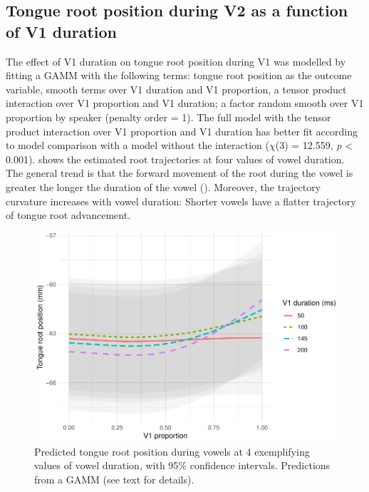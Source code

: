 \documentclass[12pt,]{article}
\begin{document}
\hypertarget{tongue-root-position-during-v2-as-a-function-of-v1-duration}{%
\subsection{Tongue root position during V2 as a function of V1
duration}\label{tongue-root-position-during-v2-as-a-function-of-v1-duration}}

The effect of V1 duration on tongue root position during V1 was modelled
by fitting a GAMM with the following terms: tongue root position as the
outcome variable, smooth terms over V1 duration and V1 proportion, a
tensor product interaction over V1 proportion and V1 duration; a factor
random smooth over V1 proportion by speaker (penalty order = 1). The
full model with the tensor product interaction over V1 proportion and V1
duration has better fit according to model comparison with a model
without the interaction (\(\chi\)(3) = 12.559, \emph{p} \textless{}
0.001).  shows the estimated root trajectories at
four values of vowel duration. The general trend is that the forward
movement of the root during the vowel is greater the longer the duration
of the vowel (). Moreover, the trajectory
curvature increases with vowel duration: Shorter vowels have a flatter
trajectory of tongue root advancement.

\begin{figure}
\includegraphics[width=\linewidth]{2018-tra_files/figure-latex/tra-gam-2-plot-1} \caption{Predicted tongue root position during vowels at 4 exemplifying values of vowel duration, with 95\% confidence intervals. Predictions from a GAMM (see text for details).}\label{f:tra-gam-2-plot}
\end{figure}
\end{document}
